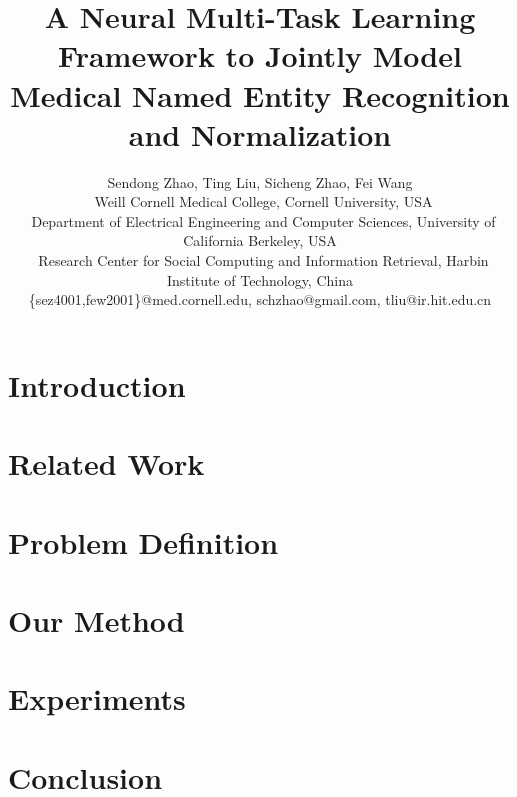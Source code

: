 \documentclass[letterpaper]{article}
\begin{document}
\title{A Neural Multi-Task Learning Framework to Jointly Model \\Medical Named Entity Recognition and Normalization}


\author{
	Sendong Zhao\footnotemark[1], Ting Liu\footnotemark[3], Sicheng Zhao\footnotemark[2], Fei Wang\footnotemark[1]\\
	\footnotemark[1]~Weill Cornell Medical College, Cornell University, USA\\
	\footnotemark[2]~Department of Electrical Engineering and Computer Sciences, University of California Berkeley, USA\\
	\footnotemark[3]~Research Center for Social Computing and Information Retrieval, Harbin Institute of Technology, China  \\
	\{sez4001,few2001\}@med.cornell.edu, schzhao@gmail.com, tliu@ir.hit.edu.cn
}


\maketitle
\begin{abstract}

\end{abstract}

\section{Introduction}
\label{sec:intro}


\section{Related Work}
\label{sec:related}


\section{Problem Definition}
\label{sec:definition}


\section{Our Method}
\label{sec:method}


\section{Experiments}
\label{sec:experiment}


\section{Conclusion}
\label{sec:conclusion}

\end{document}
